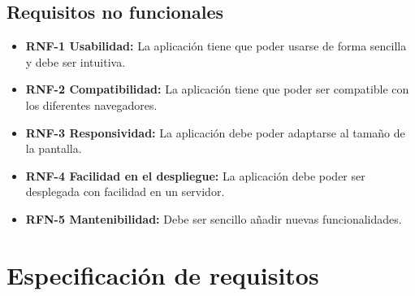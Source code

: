 \subsection{Requisitos no funcionales}
\begin{itemize}
	\item \textbf{RNF-1 Usabilidad:} La aplicación tiene que poder usarse de forma sencilla y debe ser intuitiva.
	\item \textbf{RNF-2 Compatibilidad:} La aplicación tiene que poder ser compatible con los diferentes navegadores.
	\item \textbf{RNF-3 Responsividad:} La aplicación debe poder adaptarse al tamaño de la pantalla.
	\item \textbf{RNF-4 Facilidad en el despliegue:} La aplicación debe poder ser desplegada con facilidad en un servidor.
	\item \textbf{RFN-5 Mantenibilidad:} Debe ser sencillo añadir nuevas funcionalidades.
\end{itemize}

\section{Especificación de requisitos}


